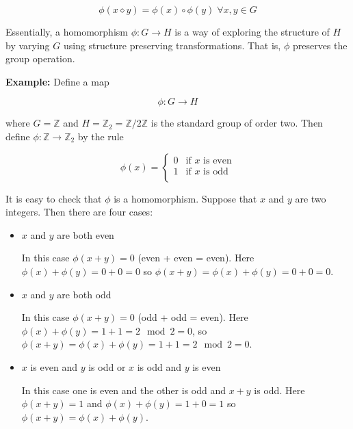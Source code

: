 \documentclass[11pt, oneside]{article}   	%
\theoremstyle{definition}
\begin{document}
\begin{equation*}
\phi(x \diamond y) = \phi(x) \circ \phi(y) \; \forall x,y \in G
\end{equation*}

\bigskip
\noindent
Essentially, a homomorphism $\phi: G \rightarrow H$ is a way of exploring the structure of $H$ by varying $G$ using structure preserving
transformations. That is, $\phi$ preserves the group operation.


\bigskip
\noindent
\textbf{Example:} Define a map

\begin{equation*}
\phi : G \rightarrow H
\end{equation*}

\bigskip
\noindent
where $G = \mathbb{Z}$  and $H = \mathbb{Z}_2 = \mathbb{Z}/2\mathbb{Z}$ is the standard group of order two. Then
define $\phi: \mathbb{Z} \rightarrow \mathbb{Z}_2$  by the rule

\begin{equation*}
  \phi(x) =
    \begin{cases}
      0 & \text{if $x$ is even} \\
      1 & \text{if $x$ is odd}\\
    \end{cases}       
\end{equation*}

\bigskip
\noindent
It is easy to check that $\phi$ is a homomorphism. Suppose that $x$ and $y$ are two integers. Then there are four cases:
\begin{itemize}
 \item $x$ and $y$ are both even
 
 In this case $\phi(x+y) = 0$ (even + even = even). Here $\phi(x)+\phi(y) = 0+0 = 0$ so $\phi(x+y) = \phi(x) + \phi(y)  = 0 + 0 = 0$. 
 
 \item $x$ and $y$ are both odd
  
In this case $\phi(x+y) = 0$ (odd + odd = even).  Here $\phi(x) + \phi(y) = 1 + 1 = 2 \mod 2 = 0$, so  $\phi(x+y) = \phi(x) + \phi(y)  = 1 + 1 = 2 \mod 2 = 0$.

 \item $x$ is even and $y$ is odd or  $x$ is odd and  $y$ is even
 
In this case one is even and the other is odd and $x + y$ is odd.  Here $\phi(x+y) = 1$ and $\phi(x)+\phi(y) = 1+0 = 1$ so $\phi(x+y) = \phi(x)+\phi(y)$.
 \end{itemize}
 
\end{document}
